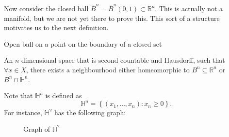 \documentclass[notoc,notitlepage]{tufte-book}
\begin{document}
\begin{eg}
  Now consider the closed ball $\bar{B}^n = \bar{B}^n(0, 1) \subset \mathbb{R}^n$. This is
  actually not a manifold, but we are not yet there to prove this. This sort of a structure
  motivates us to the next definition.
  \begin{marginfigure}
    \centering
    \caption{Open ball on a point on the boundary of a closed set}\label{fig:open_ball_on_a_point_on_the_boundary_of_a_closed_set}
  \end{marginfigure}
\end{eg}

\begin{defn}\label{defn:manifold_on_a_boundary}
  An $n$-dimensional space that is second countable and Hausdorff, such that $\forall x \in X$,
  there exists a neighbourhood either homeomorphic to $B^n \subseteq \mathbb{R}^n$ or
  $B^n \cap \mathbb{H}^n$.
\end{defn}

\begin{note}
  Note that $\mathbb{H}^n$ is defined as
  \begin{equation*}
    \mathbb{H}^n = \left\{ ( x_1, \ldots, x_n ) : x_n \geq 0 \right\}.
  \end{equation*}
  For instance, $\mathbb{H}^2$ has the following graph:
  \begin{figure}[ht]
    \centering
    \caption{Graph of $\mathbb{H}^2$}
    \label{fig:graph_of_h_2}
  \end{figure}
\end{note}



%
\label{prt:introduction_to_topological_manifolds}
\end{document}
